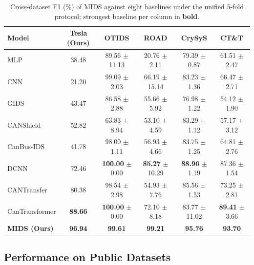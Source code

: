 \documentclass[lettersize,journal]{IEEEtran}
\begin{document}
\begin{table}[!ht]
\caption{Cross-dataset F1 (\%) of MIDS against eight baselines under the unified 5-fold protocol; strongest baseline per column in \textbf{bold}.}
\label{tab:cross_dataset}
\begin{center}
\renewcommand{\arraystretch}{1.15}
\setlength{\tabcolsep}{4pt}
\begin{tabular}{l|ccccc}
\hline
\textbf{Model} & \textbf{Tesla (Ours)} & \textbf{OTIDS} & \textbf{ROAD} & \textbf{CrySyS} & \textbf{CT\&T} \\
\hline
MLP            & 38.48 & 89.56 $\pm$ 11.13 & 20.76 $\pm$ \phantom{0}2.11 & 79.39 $\pm$ \phantom{0}0.87 & 61.51 $\pm$ 2.47 \\
CNN            & 21.20 & 99.09 $\pm$ \phantom{0}2.03 & 66.19 $\pm$ 15.14 & 83.23 $\pm$ \phantom{0}1.36 & 66.47 $\pm$ 2.71 \\
GIDS\cite{b50} & 43.47 & 86.58 $\pm$ \phantom{0}2.88 & 55.66 $\pm$ \phantom{0}5.92 & 76.98 $\pm$ \phantom{0}1.22 & 54.12 $\pm$ 1.90 \\
CANShield\cite{b51} & 52.82 & 63.83 $\pm$ \phantom{0}8.94 & 53.10 $\pm$ \phantom{0}4.59 & 83.29 $\pm$ \phantom{0}1.12 & 57.17 $\pm$ 3.12 \\
CanBus-IDS\cite{b52} & 41.78 & 98.00 $\pm$ \phantom{0}1.11 & 56.93 $\pm$ \phantom{0}4.66 & 83.75 $\pm$ \phantom{0}1.25 & 64.81 $\pm$ 2.76 \\
DCNN\cite{b53} & 72.46 & \textbf{100.00} $\pm$ \phantom{0}0.00 & \textbf{85.27} $\pm$ 10.29 & \textbf{88.96} $\pm$ \phantom{0}1.19 & 87.36 $\pm$ 1.54 \\
CANTransfer\cite{b54} & 80.38 & 98.54 $\pm$ \phantom{0}2.98 & 54.93 $\pm$ \phantom{0}7.76 & 85.56 $\pm$ \phantom{0}1.53 & 73.25 $\pm$ 2.81 \\
CanTransformer\cite{b55} & \textbf{88.66} & \textbf{100.00} $\pm$ \phantom{0}0.00 & 72.10 $\pm$ \phantom{0}8.18 & 83.77 $\pm$ 11.02 & \textbf{89.41} $\pm$ 3.66 \\
\hline
\textbf{MIDS (Ours)} & \textbf{96.94} & \textbf{99.61} & \textbf{99.21} & \textbf{95.76} & \textbf{93.70} \\
\hline
\end{tabular}
\end{center}
\end{table}

\subsection{Performance on Public Datasets}
\label{sec:exp_public}
\end{document}
